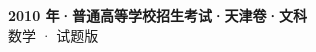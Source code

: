 \documentclass[zihao=-4, a4paper]{ctexart}
\begin{document}
\begin{center}
  {\Large\bfseries 2010 年·普通高等学校招生考试·天津卷·文科}\\[4pt]
  {\large 数学 · 试题版}
\end{center}
\medskip
{}

\end{document}
